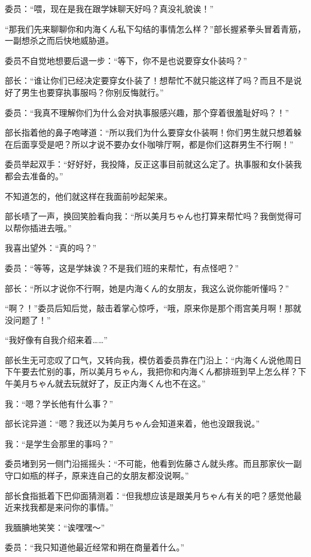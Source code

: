 委员：“喂，现在是我在跟学妹聊天好吗？真没礼貌诶！”

“那我们先来聊聊你和内海くん私下勾结的事情怎么样？”部长握紧拳头冒着青筋，一副想杀之而后快地威胁道。

委员不自觉地想要后退一步：“等下，你不是也说要穿女仆装吗？”

部长：“谁让你们已经决定要穿女仆装了！想帮忙不就只能这样了吗？而且不是说好了男生也要穿执事服吗？你别反悔就行。”

委员：“我真不理解你们为什么会对执事服感兴趣，那个穿着很羞耻好吗？！”

部长指着他的鼻子咆哮道：“所以我们为什么要穿女仆装啊！你们男生就只想着躲在后面享受是吧？所以才说不要办女仆咖啡厅啊，都是你们这群男生不行啊！”

委员举起双手：“好好好，我投降，反正这事目前就这么定了。执事服和女仆装我都会去准备的。”

不知道怎的，他们就这样在我面前吵起架来。

部长啧了一声，换回笑脸看向我：“所以美月ちゃん也打算来帮忙吗？我倒觉得可以帮你插进去哦。”

我喜出望外：“真的吗？”

委员：“等等，这是学妹诶？不是我们班的来帮忙，有点怪吧？”

部长：“所以才说你不行啊，她是内海くん的女朋友，我这么说你能听懂吗？”

“啊？！”委员后知后觉，敲击着掌心惊呼，“哦，原来你是那个雨宫美月啊！那就没问题了！”

“我好像有自我介绍来着……”


部长生无可恋叹了口气，又转向我，模仿着委员靠在门沿上：“内海くん说他周日下午要去忙别的事，所以美月ちゃん，我把你和内海くん都排班到早上怎么样？下午美月ちゃん就去玩就好了，反正内海くん也不在这。”

我：“嗯？学长他有什么事？”

部长诧异道：“嗯？我还以为美月ちゃん会知道来着，他也没跟我说。”

我：“是学生会那里的事吗？”

委员堵到另一侧门沿摇摇头：“不可能，他看到佐藤さん就头疼。而且那家伙一副守口如瓶的样子，原来连自己的女朋友都没说啊。”

部长食指抵着下巴仰面猜测着：“但我想应该是跟美月ちゃん有关的吧？感觉他最近来找我都是来问你的事情。”

我腼腆地笑笑：“诶嘿嘿～”

委员：“我只知道他最近经常和朔在商量着什么。”

